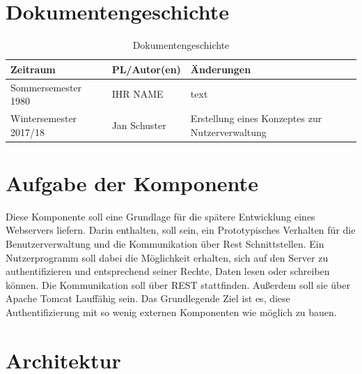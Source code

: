 \documentclass[german]{book}
\begin{document}
\section{Dokumentengeschichte}
\begin{table}[h]
 \begin{tabular}{|l|l|p{4cm}|}
 \hline
 Zeitraum & PL/Autor(en) & Änderungen \\
 \hline
 Sommersemester 1980 & IHR NAME & 
text \newline 
 
  \\
 \hline
 Wintersemester 2017/18 & Jan Schuster & 
Erstellung eines Konzeptes zur Nutzerverwaltung
\newline 

 
  \\
 \hline
 \end{tabular}
 \caption{Dokumentengeschichte}
 \end{table}

\section{Aufgabe der Komponente}
Diese Komponente soll eine Grundlage für die spätere Entwicklung eines Webservers liefern. Darin enthalten, soll sein,  ein Prototypisches Verhalten für die Benutzerverwaltung und die Kommunikation über Rest Schnittstellen. Ein Nutzerprogramm soll dabei die Möglichkeit erhalten, sich auf den Server zu authentifizieren und entsprechend seiner Rechte, Daten lesen oder schreiben können. Die Kommunikation soll über REST stattfinden. Außerdem soll sie über Apache Tomcat Lauffähig sein. 
\newline
\newline
Das Grundlegende Ziel ist es, diese Authentifizierung mit so wenig externen Komponenten wie möglich zu bauen. 

\newpage

\section{Architektur}
\end{document}
